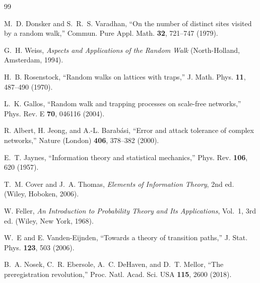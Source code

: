 \documentclass[aps,pre,twocolumn,superscriptaddress,floatfix,longbibliography]{revtex4-2}
\begin{document}
\begin{thebibliography}{99}

 M.~D. Donsker and S.~R.~S. Varadhan,
``On the number of distinct sites visited by a random walk,''
Commun. Pure Appl. Math. \textbf{32}, 721--747 (1979).

 G.~H. Weiss,
\emph{Aspects and Applications of the Random Walk} (North-Holland, Amsterdam, 1994).

 H.~B. Rosenstock,
``Random walks on lattices with traps,''
J. Math. Phys. \textbf{11}, 487--490 (1970).

 L.~K. Gallos,
``Random walk and trapping processes on scale-free networks,''
Phys. Rev. E \textbf{70}, 046116 (2004).

 R. Albert, H. Jeong, and A.-L. Barab\'asi,
``Error and attack tolerance of complex networks,''
Nature (London) \textbf{406}, 378--382 (2000).

 E.~T. Jaynes,
``Information theory and statistical mechanics,''
Phys. Rev. \textbf{106}, 620 (1957).

 T.~M. Cover and J.~A. Thomas,
\emph{Elements of Information Theory}, 2nd ed. (Wiley, Hoboken, 2006).

 W. Feller,
\emph{An Introduction to Probability Theory and Its Applications}, Vol.~1, 3rd ed.
(Wiley, New York, 1968).

 W.~E and E. Vanden-Eijnden,
``Towards a theory of transition paths,''
J. Stat. Phys. \textbf{123}, 503 (2006).

 B.~A. Nosek, C.~R. Ebersole, A.~C. DeHaven, and D.~T. Mellor,
``The preregistration revolution,''
Proc. Natl. Acad. Sci. USA \textbf{115}, 2600 (2018).

\end{thebibliography}
\end{document}
